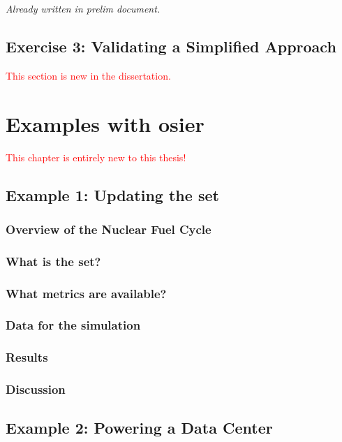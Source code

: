 \textit{Already written in prelim document.}

\section{Exercise 3: Validating a Simplified Approach}

\textcolor{red}{This section is new in the dissertation.}

\chapter{Examples with \acs{osier}}
\label{chapter:examples}

\textcolor{red}{This chapter is entirely new to this thesis!}

\section{Example 1: Updating the \ac{set}}

\subsection{Overview of the Nuclear Fuel Cycle}

\subsection{What is the \ac{set}?}

\subsection{What metrics are available?}

\subsection{Data for the simulation}

\subsection{Results}

\subsection{Discussion}

\section{Example 2: Powering a Data Center}

